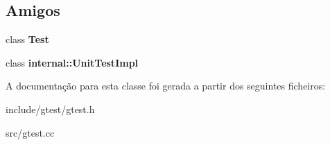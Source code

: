 \subsection*{Amigos}
\begin{DoxyCompactItemize}
\item 
\hypertarget{classtesting_1_1TestCase_a5b78b1c2e1fa07ffed92da365593eaa4}{class {\bfseries Test}}\label{classtesting_1_1TestCase_a5b78b1c2e1fa07ffed92da365593eaa4}

\item 
\hypertarget{classtesting_1_1TestCase_acc0a5e7573fd6ae7ad1878613bb86853}{class {\bfseries internal\-::\-Unit\-Test\-Impl}}\label{classtesting_1_1TestCase_acc0a5e7573fd6ae7ad1878613bb86853}

\end{DoxyCompactItemize}


A documentação para esta classe foi gerada a partir dos seguintes ficheiros\-:\begin{DoxyCompactItemize}
\item 
include/gtest/gtest.\-h\item 
src/gtest.\-cc\end{DoxyCompactItemize}
